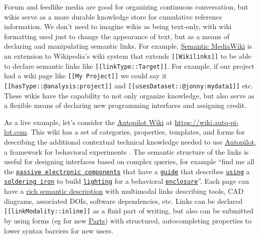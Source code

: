 \documentclass[10pt]{article}
\begin{document}
\begin{multicols}{2}
Forum and feedlike media are good for organizing continuous
conversation, but wikis serve as a more durable knowledge store for
cumulative reference information. We don't need to imagine wikis as
being text-only, with wiki formatting used just to change the appearance
of text, but as a means of declaring and manipulating semantic links.
For example,
\href{https://www.semantic-mediawiki.org/wiki/Semantic_MediaWiki}{Semantic
MediaWiki} is an extension to Wikipedia's wiki system that extends
\texttt{{[}{[}Wikilinks{]}{]}} to be able to declare semantic links like
\texttt{{[}{[}linkType::Target{]}{]}}. For example, if our project had a
wiki page like \texttt{{[}{[}My\ Project{]}{]}} we could say it
\texttt{{[}{[}hasType::@analysis:project{]}{]}} and
\texttt{{[}{[}usesDataset::@jonny:mydata1{]}{]}} etc. These wikis have
the capability to not only organize knowledge, but also serve as a
flexible means of declaring new programming interfaces and assigning
credit.

As a live example, let's consider the
\href{https://wiki.auto-pi-lot.com}{Autopilot Wiki} at
\url{https://wiki.auto-pi-lot.com}. This wiki has a set of categories,
properties, templates, and forms for describing the additional
contextual technical knowledge needed to use
\href{https://docs.auto-pi-lot.com/en/latest/}{Autopilot}, a framework
for behavioral experiments \cite{saundersAutopilotAutomatingBehavioral2019} . The semantic structure
of the links is useful for designing interfaces based on complex
queries, for example ``find me all the
\href{https://wiki.auto-pi-lot.com/index.php/Category:Passive_Component}{\texttt{passive\ electronic\ components}}
that have a
\href{https://wiki.auto-pi-lot.com/index.php/Category:Guide}{\texttt{guide}}
that describes
\href{https://wiki.auto-pi-lot.com/index.php/Property:Uses_Tool}{\texttt{using}}
a
\href{https://wiki.auto-pi-lot.com/index.php?title=Property\%3AUses+Tool\&limit=20\&offset=0\&filter=Soldering+Iron}{\texttt{soldering\ iron}}
to build
\href{https://wiki.auto-pi-lot.com/index.php?title=Property\%3AModality\&limit=20\&offset=0\&filter=Illumination}{\texttt{lighting}}
for a behavioral
\href{https://wiki.auto-pi-lot.com/index.php?title=Property\%3AModality\&limit=20\&offset=0\&filter=Enclosures}{\texttt{enclosure}}''.
Each page can have a
\href{https://wiki.auto-pi-lot.com/index.php/Autopilot_Behavior_Box\#tab-content-facts-list}{rich
semantic description} with multimodal links describing tools, CAD
diagrams, associated DOIs, software dependencies, etc. Links can be
declared \texttt{{[}{[}linkModality::inline{]}{]}} as a fluid part of
writing, but also can be submitted by using forms (eg for new
\href{https://wiki.auto-pi-lot.com/index.php/Form:Part}{Parts}) with
structured, autocompleting properties to lower syntax barriers for new
users.


\end{multicols}
\end{document}
